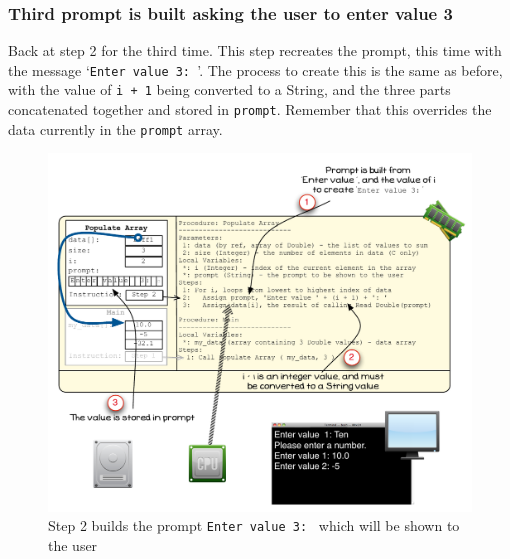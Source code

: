 


\clearpage
\subsubsection{Third prompt is built asking the user to enter value 3} %
\label{ssub:third_prompt_is_built_asking_the_user_to_enter_value_3}

Back at step 2 for the third time. This step recreates the prompt, this time with the message `\texttt{Enter value 3: }'. The process to create this is the same as before, with the value of \texttt{i + 1} being converted to a String, and the three parts concatenated together and stored in \texttt{prompt}. Remember that this overrides the data currently in the \texttt{prompt} array.

\begin{figure}[htbp]
   \centering
   \includegraphics[width=\textwidth]{./topics/arrays/images/PopulateArray10} 
   \caption{Step 2 builds the prompt \texttt{Enter value 3: } which will be shown to the user}
   \label{fig:populate-array-vis-10}
\end{figure}

